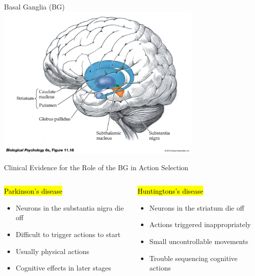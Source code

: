 \documentclass[handout,aspectratio=169]{beamer}
\begin{document}
	\begin{frame}{Basal Ganglia (BG)}
		\centering
		\includegraphics[height=7.5cm]{media/basal_ganglia.jpg}
	\end{frame}

	\begin{frame}{Clinical Evidence for the Role of the BG in Action Selection}
		\begin{columns}[t]
			\begin{block}{\hl{Parkinson's disease}}
				\begin{itemize}			
					\setlength{\itemsep}{0.5cm}
					\item Neurons in the substantia nigra die off
					\item Difficult to trigger actions to start
					\item Usually physical actions
					\item Cognitive effects in later stages
				\end{itemize}
			\end{block}
			\begin{block}{\hl{Huntingtons's disease}}
				\begin{itemize}			
					\setlength{\itemsep}{0.5cm}
					\item Neurons in the striatum die off
					\item Actions triggered inappropriately
					\item Small uncontrollable movements
					\item Trouble sequencing cognitive actions					
				\end{itemize}
			\end{block}
		\end{columns}
	\end{frame}
\end{document}
